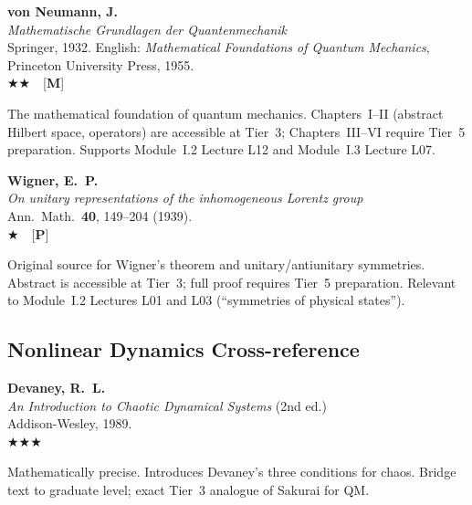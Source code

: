 \documentclass[11pt,a4paper]{article}
\newcommand{\essential}{$\bigstar\bigstar\bigstar$}
\newcommand{\recommended}{$\bigstar\bigstar$}
\newcommand{\useful}{$\bigstar$}
\newenvironment{bibentry}[1]{%
  \begin{tcolorbox}[entrybox=#1, top=4pt, bottom=4pt]%
}{%
  \end{tcolorbox}\smallskip%
}
\begin{document}
\begin{bibentry}{t3light}
\textbf{von Neumann, J.}\\
\textit{Mathematische Grundlagen der Quantenmechanik}\\
Springer, 1932. English: \textit{Mathematical Foundations of Quantum Mechanics},
Princeton University Press, 1955.\\[4pt]
\recommended\ \ [\textbf{M}]\\[4pt]
\begin{tcolorbox}[annotbox]
The mathematical foundation of quantum mechanics. Chapters~I--II (abstract Hilbert
space, operators) are accessible at Tier~3; Chapters~III--VI require Tier~5
preparation. Supports Module~I.2 Lecture L12 and Module~I.3 Lecture L07.
\end{tcolorbox}
\end{bibentry}

\begin{bibentry}{t3light}
\textbf{Wigner, E.~P.}\\
\textit{On unitary representations of the inhomogeneous Lorentz group}\\
Ann.~Math.~\textbf{40}, 149--204 (1939).\\[4pt]
\useful\ \ [\textbf{P}]\\[4pt]
\begin{tcolorbox}[annotbox]
Original source for Wigner's theorem and unitary/antiunitary symmetries. Abstract is
accessible at Tier~3; full proof requires Tier~5 preparation. Relevant to Module~I.2
Lectures L01 and L03 (``symmetries of physical states'').
\end{tcolorbox}
\end{bibentry}

\subsection{Nonlinear Dynamics Cross-reference}

\begin{bibentry}{t3light}
\textbf{Devaney, R.~L.}\\
\textit{An Introduction to Chaotic Dynamical Systems} (2nd ed.)\\
Addison-Wesley, 1989.\\[4pt]
\essential\\[4pt]
\begin{tcolorbox}[annotbox]
Mathematically precise. Introduces Devaney's three conditions for chaos. Bridge text
to graduate level; exact Tier~3 analogue of Sakurai for QM.
\end{tcolorbox}
\end{bibentry}
\end{document}
